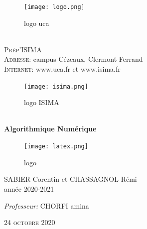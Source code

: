 \documentclass[a4paper]{article}
\begin{document}
\begin{titlepage}
  \begin{center}
    
    \begin{figure}[h]
      \centering
      \texttt{[image: logo.png]}
      \caption{logo uca}
      \label{uca}
    \end{figure}
    \\[1.5cm]
    \textsc{\LARGE Prép'ISIMA}\\[0.5cm]
    
    \textsc{Adresse:} campus Cézeaux, Clermont-Ferrand\\
    \textsc{Internet:} www.uca.fr et www.isima.fr\\[0.5cm]

    \begin{figure}[h]
      \centering
      \texttt{[image: isima.png]}
      \caption{logo ISIMA}
      \label{isima}
    \end{figure}\\[1cm]
    
    {\huge \bfseries Algorithmique Numérique\\[0.4cm]}

    \begin{figure}[h]
      \centering
      \texttt{[image: latex.png]}
      \caption{logo }
    \end{figure}

    \begin{minipage}{0.9\textwidth}
      \begin{flushleft} \large
        SABIER Corentin et CHASSAGNOL Rémi\\
        année 2020-2021\\[2cm]
      \end{flushleft}
    \end{minipage}

    \begin{minipage}{0.9\textwidth}
      \begin{flushright} \large
        \emph{Professeur:} CHORFI amina\\
      \end{flushright}
    \end{minipage}

    \textsc{24 octobre 2020}

  \end{center}
\end{titlepage}

\clearpage
\end{document}
